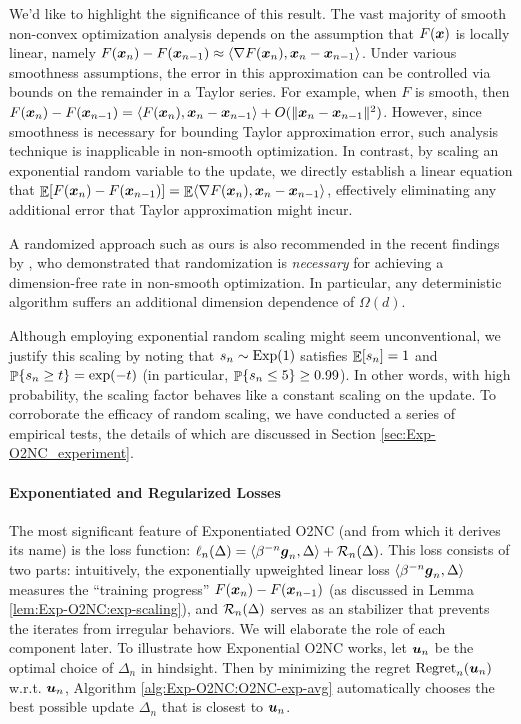We'd like to highlight the significance of this result. The vast majority of smooth non-convex optimization analysis depends on the assumption that $F(\vecx)$ is locally linear, namely $F(\vecx_n)-F(\vecx_{n-1}) \approx \langle \nabla F(\vecx_n), \vecx_n-\vecx_{n-1}\rangle$. Under various smoothness assumptions, the error in this approximation can be controlled via bounds on the remainder in a Taylor series. For example, when $F$ is smooth, then $F(\vecx_n) - F(\vecx_{n-1}) = \langle F(\vecx_n),\vecx_n-\vecx_{n-1}\rangle + O(\|\vecx_n-\vecx_{n-1}\|^2)$. However, since smoothness is necessary for bounding Taylor approximation error, such analysis technique is inapplicable in non-smooth optimization. In contrast, by scaling an exponential random variable to the update, we directly establish a linear equation that $\E[F(\vecx_n)-F(\vecx_{n-1})]=\E\langle \nabla F(\vecx_n),\vecx_n-\vecx_{n-1}\rangle$, effectively eliminating any additional error that Taylor approximation might incur. 

A randomized approach such as ours is also recommended in the recent findings by \citet{jordan2023deterministic}, who demonstrated that randomization is \emph{necessary} for achieving a dimension-free rate in non-smooth optimization. In particular, any deterministic algorithm suffers an additional dimension dependence of $\Omega(d)$. 

Although employing exponential random scaling might seem unconventional, we justify this scaling by noting that $s_n\sim\Expo(1)$ satisfies $\E[s_n]=1$ and $\P\{s_n \ge t\} = \exp(-t)$ (in particular, $\P\{s_n \le 5\} \ge 0.99$). In other words, with high probability, the scaling factor behaves like a constant scaling on the update. To corroborate the efficacy of random scaling, we have conducted a series of empirical tests, the details of which are discussed in Section \ref{sec:Exp-O2NC_experiment}.


\paragraph{Exponentiated and Regularized Losses}
The most significant feature of Exponentiated O2NC (and from which it derives its name) is the loss function: $\ell_n(\Delta) = \langle \beta^{-n}\vecg_n, \Delta\rangle + \calR_n(\Delta)$. This loss consists of two parts: intuitively, the exponentially upweighted linear loss $\langle \beta^{-n}\vecg_n,\Delta\rangle$ measures the ``training progress'' $F(\vecx_n)-F(\vecx_{n-1})$ (as discussed in Lemma \ref{lem:Exp-O2NC:exp-scaling}), and $\calR_n(\Delta)$ serves as an stabilizer that prevents the iterates from irregular behaviors. We will elaborate the role of each component later.
To illustrate how Exponential O2NC works, let $\vecu_n$ be the optimal choice of $\Delta_n$ in hindsight. Then by minimizing the regret $\regret_n(\vecu_n)$ w.r.t. $\vecu_n$, Algorithm \ref{alg:Exp-O2NC:O2NC-exp-avg} automatically chooses the best possible update $\Delta_n$ that is closest to $\vecu_n$.


